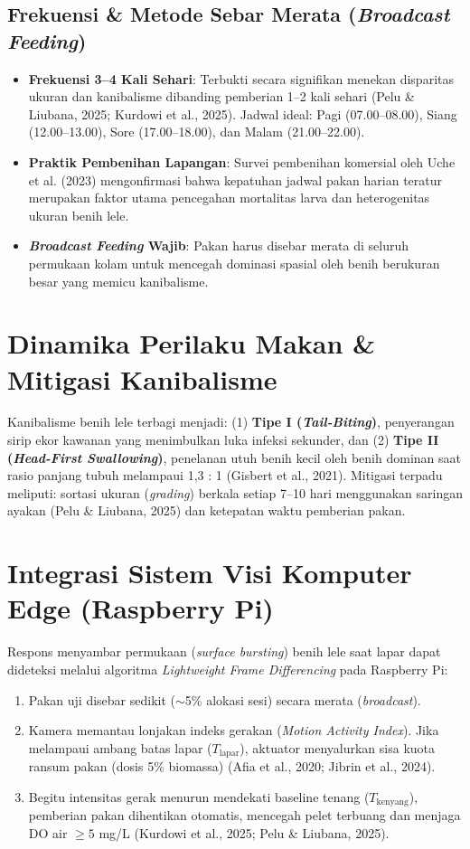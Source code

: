 \documentclass[11pt,a4paper]{article}
\begin{document}
\subsection{Frekuensi \& Metode Sebar Merata (\textit{Broadcast Feeding})}
\begin{itemize}[leftmargin=*,itemsep=2pt,topsep=2pt]
    \item \textbf{Frekuensi 3--4 Kali Sehari}: Terbukti secara signifikan menekan disparitas ukuran dan kanibalisme dibanding pemberian 1--2 kali sehari (Pelu \& Liubana, 2025; Kurdowi et al., 2025). Jadwal ideal: Pagi (07.00--08.00), Siang (12.00--13.00), Sore (17.00--18.00), dan Malam (21.00--22.00).
    \item \textbf{Praktik Pembenihan Lapangan}: Survei pembenihan komersial oleh Uche et al. (2023) mengonfirmasi bahwa kepatuhan jadwal pakan harian teratur merupakan faktor utama pencegahan mortalitas larva dan heterogenitas ukuran benih lele.
    \item \textbf{\textit{Broadcast Feeding} Wajib}: Pakan harus disebar merata di seluruh permukaan kolam untuk mencegah dominasi spasial oleh benih berukuran besar yang memicu kanibalisme.
\end{itemize}

\section{Dinamika Perilaku Makan \& Mitigasi Kanibalisme}
Kanibalisme benih lele terbagi menjadi: (1) \textbf{Tipe I (\textit{Tail-Biting})}, penyerangan sirip ekor kawanan yang menimbulkan luka infeksi sekunder, dan (2) \textbf{Tipe II (\textit{Head-First Swallowing})}, penelanan utuh benih kecil oleh benih dominan saat rasio panjang tubuh melampaui 1,3 : 1 (Gisbert et al., 2021).
Mitigasi terpadu meliputi: sortasi ukuran (\textit{grading}) berkala setiap 7--10 hari menggunakan saringan ayakan (Pelu \& Liubana, 2025) dan ketepatan waktu pemberian pakan.

\section{Integrasi Sistem Visi Komputer Edge (Raspberry Pi)}
Respons menyambar permukaan (\textit{surface bursting}) benih lele saat lapar dapat dideteksi melalui algoritma \textit{Lightweight Frame Differencing} pada Raspberry Pi:
\begin{enumerate}[leftmargin=*,itemsep=2pt,topsep=2pt]
    \item Pakan uji disebar sedikit ($\sim$5\% alokasi sesi) secara merata (\textit{broadcast}).
    \item Kamera memantau lonjakan indeks gerakan (\textit{Motion Activity Index}). Jika melampaui ambang batas lapar ($T_{\text{lapar}}$), aktuator menyalurkan sisa kuota ransum pakan (dosis 5\% biomassa) (Afia et al., 2020; Jibrin et al., 2024).
    \item Begitu intensitas gerak menurun mendekati baseline tenang ($T_{\text{kenyang}}$), pemberian pakan dihentikan otomatis, mencegah pelet terbuang dan menjaga DO air $\ge 5$ mg/L (Kurdowi et al., 2025; Pelu \& Liubana, 2025).
\end{enumerate}
\end{document}

